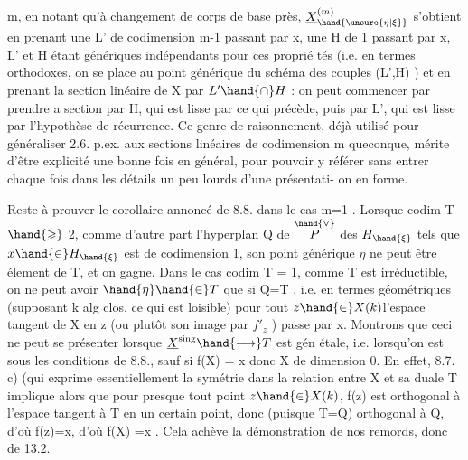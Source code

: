 
\placedmargin{|}m, en notant qu'à changement de corps de base près, $\underline{X}^{(m)}_{\hand{\unsure{\eta|\xi}}}$ s'obtient en
prenant une L' de codimension m-1 passant par x, une H de 
1 passant par x, L' et H étant génériques indépendants pour ces proprié
tés (i.e. en termes orthodoxes, on se place au point générique du 
schéma des couples (L',H)  ) et en prenant la section linéaire
de X par $L'\hand{\cap} H$ : on peut commencer par prendre a section par H, qui
est lisse par ce qui précède, puis par L', qui est lisse par l'hypothèse
de récurrence. Ce genre de raisonnement, déjà utilisé pour généraliser
2.6. p.ex. aux sections linéaires de codimension m queconque, mérite
d'être explicité une bonne fois en général, pour pouvoir y référer sans
entrer  chaque fois dans les détails un peu lourds d'une présentati-%
on en forme.

Reste à prouver le corollaire annoncé de 8.8. dans le cas m=1 .
Lorsque  codim T $\hand{\geqslant}$ 2, comme d'autre part l'hyperplan Q de $\overset{\hand{\vee}}{P}$ des
$H_{\hand{\xi}}$ tels que $x\hand{\in} H_{\hand{\xi}}$ est de codimension 1, son point générique $\eta$ ne peut
être élement de T, et on gagne. Dans le cas codim T = 1, comme T est
irréductible, on ne peut avoir $\hand{\eta}\hand{\in} T$ que si Q=T ,
i.e. en termes géométriques  (supposant k alg clos, ce qui est loisible) pour tout $z\hand{\in} X(k)$l'espace tangent
de X en z (ou plutôt son image par $f'_{z}$ ) passe par x. Montrons que
ceci ne peut se présenter lorsque $\underline{X}^{\mathrm{sing}}\hand{\longrightarrow}T$ est gén étale, i.e.
lorsqu'on est sous les conditions de 8.8., sauf si f(X) = \hand{\{}x\hand{\}} donc X
de dimension 0. En effet, 8.7. c) (qui exprime essentiellement la
symétrie  dans la relation entre X et sa duale T\hand{)} implique alors que
pour presque tout point $z\hand{\in} X(k)$, f(z) est orthogonal à l'espace tangent
à T en un certain point, donc (puisque T=Q) orthogonal à Q, d'où f(z)=x, d'où
f(X) =\hand{\{}x\hand{\}} . Cela achève la démonstration de nos remords, donc de 13.2.

